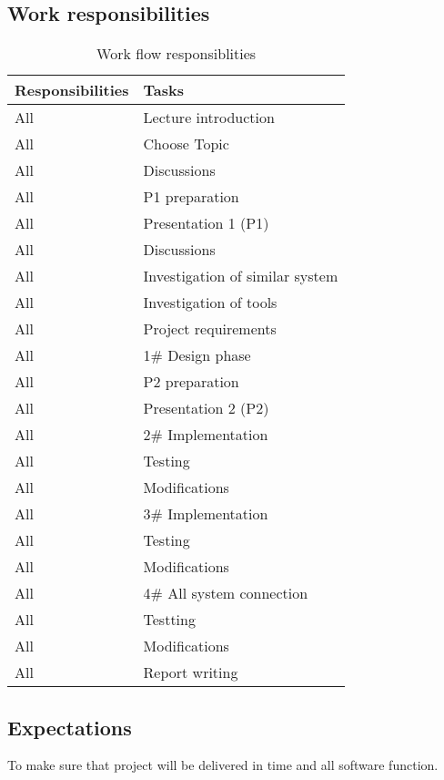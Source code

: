 \newpage
\subsection{Work responsibilities}


\begin{table}[h]
	\centering
    \begin{tabular}{ | p{3cm} | p{5cm} |}
    \hline
    \textbf{Responsibilities} &  \textbf{Tasks} \\ \hline
    All & Lecture introduction\\ \hline
    All & Choose Topic\\ \hline
    All & Discussions\\ \hline
    All & P1 preparation\\ \hline
    All & Presentation 1 (P1)\\ \hline
    All & Discussions\\ \hline
    All & Investigation of similar system\\ \hline
    All & Investigation of tools\\ \hline
    All & Project requirements\\ \hline
    All & 1\# Design phase\\ \hline
    All & P2 preparation\\ \hline
    All & Presentation 2 (P2)\\ \hline
    All & 2\# Implementation\\ \hline
    All & Testing\\ \hline
    All & Modifications\\ \hline
    All & 3\# Implementation\\ \hline
    All & Testing\\ \hline
    All & Modifications\\ \hline
    All & 4\# All system connection\\ \hline
    All & Testting\\ \hline
    All & Modifications\\ \hline
    All & Report writing\\ \hline
 		\end{tabular}
 		\caption{Work flow responsiblities}
	\label{tab:WorkFlowResponsiblities}
\end{table}


\subsection{Expectations}

To make sure that project will be delivered in time and all software function.
